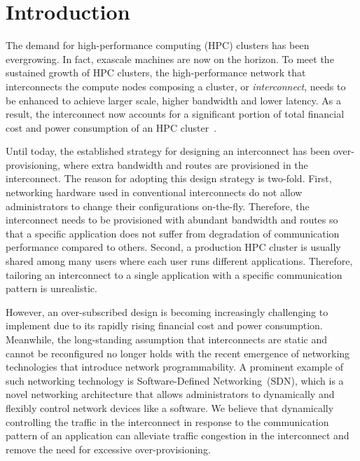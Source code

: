\documentclass[graybox]{svmult}
\begin{document}
\section{Introduction}\label{kt:sec:i}

The demand for high-performance computing (HPC) clusters has been
evergrowing. In fact, exascale machines are now on the horizon. To meet the
sustained growth of HPC clusters, the high-performance network that
interconnects the compute nodes composing a cluster, or \textit{interconnect},
needs to be enhanced to achieve larger scale, higher bandwidth and lower
latency. As a result, the interconnect now accounts for a significant portion
of total financial cost and power consumption of an HPC
cluster~\cite{Michelogiannakis2017}.

Until today, the established strategy for designing an interconnect has been
over-provisioning, where extra bandwidth and routes are provisioned in the
interconnect. The reason for adopting this design strategy is two-fold. First,
networking hardware used in conventional interconnects do not allow
administrators to change their configurations on-the-fly. Therefore, the
interconnect needs to be provisioned with abundant bandwidth and routes so
that a specific application does not suffer from degradation of communication
performance compared to others. Second, a production HPC cluster is usually
shared among many users where each user runs different applications.
Therefore, tailoring an interconnect to a single application with a specific
communication pattern is unrealistic.

However, an over-subscribed design is becoming increasingly challenging to
implement due to its rapidly rising financial cost and power consumption.
Meanwhile, the long-standing assumption that interconnects are static and
cannot be reconfigured no longer holds with the recent emergence of networking
technologies that introduce network programmability. A prominent example of
such networking technology is Software-Defined Networking~(SDN), which is a
novel networking architecture that allows administrators to dynamically and
flexibly control network devices like a software. We believe that dynamically
controlling the traffic in the interconnect in response to the communication
pattern of an application can alleviate traffic congestion in the interconnect
and remove the need for excessive over-provisioning.
\end{document}

